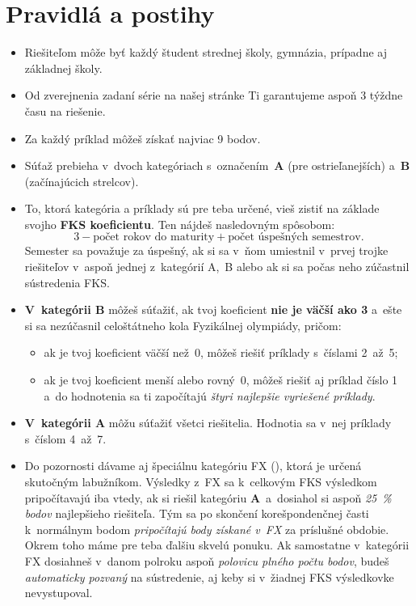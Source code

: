 \pagestyle{rules}

\section{Pravidlá a postihy}
    \begin{itemize}
        \item Riešiteľom môže byť každý študent strednej školy, gymnázia, prípadne aj základnej školy.
        
        \item Od zverejnenia zadaní série na našej stránke Ti garantujeme aspoň 3 týždne času na riešenie.
    
        \item Za každý príklad môžeš získať najviac 9 bodov. 
    
        \item Súťaž prebieha v~dvoch kategóriach s~označením~\textbf{A} (pre ostrieľanejších) a~\textbf{B} (začínajúcich strelcov).
    
        \item To, ktorá kategória a príklady sú pre teba určené, vieš zistiť na základe svojho \textbf{FKS koeficientu}. 
            Ten nájdeš nasledovným spôsobom:
            $$3 - \text{počet rokov do maturity} + \text{počet úspešných semestrov.}$$
            Semester sa považuje za úspešný, ak si sa v~ňom umiestnil v~prvej trojke riešiteľov v~aspoň jednej z~kategórií A,~B 
            alebo ak si sa počas neho zúčastnil sústredenia FKS.
        
        \item \textbf{V~kategórii B} môžeš súťažiť, ak tvoj koeficient \textbf{nie je väčší ako 3} 
            a~ešte si sa nezúčasnil celoštátneho kola Fyzikálnej olympiády, pričom:
            \begin{itemize}
                \item ak je tvoj koeficient väčší než~0, môžeš riešiť príklady s~číslami 2~až~5;
                \item ak je tvoj koeficient menší alebo rovný~0, môžeš riešiť aj príklad číslo 1 a~do hodnotenia sa ti započítajú \emph{štyri najlepšie vyriešené príklady}.
            \end{itemize}
    
        \item \textbf{V~kategórii A} môžu súťažiť všetci riešitelia. Hodnotia sa v~nej príklady s~číslom 4~až~7.
    
        \item Do pozornosti dávame aj špeciálnu kategóriu FX (),
            ktorá je určená skutočným labužníkom. Výsledky z~FX sa k~celkovým FKS výsledkom 
            pripočítavajú iba vtedy, ak si riešil kategóriu \textbf{A}~a~dosiahol si aspoň \emph{\SI{25}{\percent} bodov} najlepšieho riešiteľa.
            Tým sa po skončení korešpondenčnej časti k~normálnym bodom \emph{pripočítajú body
            získané v~FX} za príslušné obdobie. Okrem toho máme pre teba ďalšiu skvelú ponuku.
            Ak samostatne v~kategórii FX dosiahneš v~danom polroku aspoň \emph{polovicu plného počtu
            bodov}, budeš \emph{automaticky pozvaný} na sústredenie, aj keby si v~žiadnej FKS
            výsledkovke nevystupoval.
    

\end{itemize}
